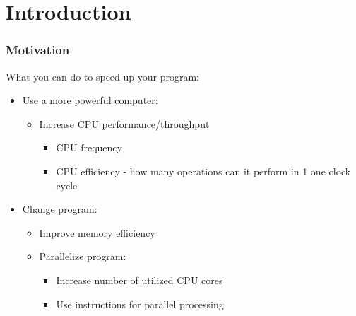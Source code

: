 \documentclass{beamer}
\subtitle{Lecture 01. Introduction}
\author{Pavel Píša \phantom{xxxxxxxxx} Petr Štěpán \\ \small\texttt{pisa@fel.cvut.cz} \phantom{xx} \small\texttt{stepan@fel.cvut.cz} \\
\phantom{xxxxxxxxx} \\
License: CC-BY-SA}
\begin{document}
\maketitle

\section{Introduction}


\begin{frame}
\frametitle{Motivation}
What you can do to speed up your program:
\begin{itemize}
\item Use a more powerful computer:
  \begin{itemize}
  \item Increase CPU performance/throughput
    \begin{itemize}
    \item CPU frequency
    \item CPU efficiency - how many operations can it perform in 1 one clock cycle
    \end{itemize}
  \end{itemize}
\item Change program:
  \begin{itemize}
  \item Improve memory efficiency
  \item Parallelize program:
    \begin{itemize}
    \item Increase number of utilized CPU cores
    \item Use instructions for parallel processing
    \end{itemize}
  \end{itemize}
\end{itemize}
\end{frame}
\end{document}
